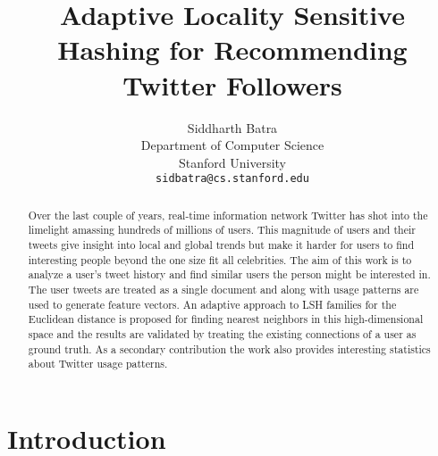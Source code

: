 \documentclass{article}
\title{Adaptive Locality Sensitive Hashing for Recommending Twitter Followers}
\author{
Siddharth Batra \\
Department of Computer Science\\
Stanford  University\\
\texttt{sidbatra@cs.stanford.edu} \\
}
\begin{document}
\maketitle

\begin{abstract}
Over the last couple of years, real-time information network Twitter has shot into
the limelight amassing hundreds of millions of users. This magnitude of users
and their tweets give insight into local and global trends but make it harder for users
to find interesting people beyond the one size fit all celebrities. The aim
of this work is to analyze a user's tweet history and find similar
users the person might be interested in. The user tweets are treated as a single
document and along with usage patterns are used to generate feature vectors. 
An adaptive approach to LSH families for the Euclidean distance is proposed for
finding nearest neighbors in this high-dimensional space and the results
are validated by treating the existing connections of a user as ground truth. As a
secondary contribution the work also provides interesting statistics about
Twitter usage patterns.
\end{abstract}

\section{Introduction}
\end{document}
